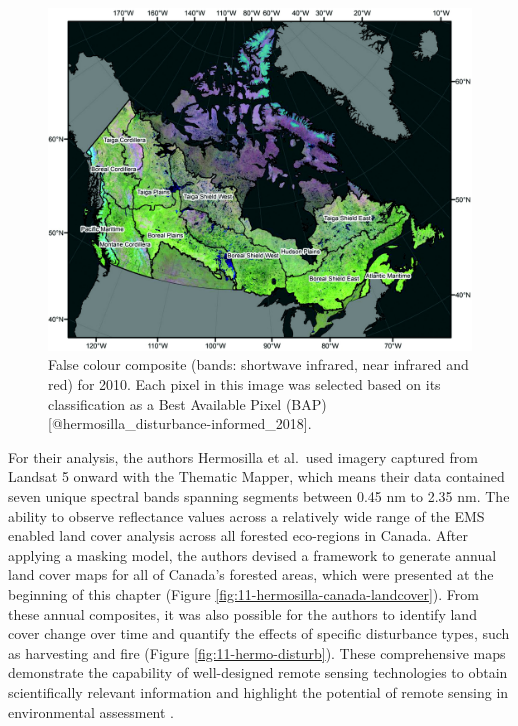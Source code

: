 \documentclass[
]{book}
\begin{document}
\begin{figure}
\includegraphics[width=0.9\linewidth]{images/11-hermosilla-false-colour} \caption{False colour composite (bands: shortwave infrared, near infrared and red) for 2010. Each pixel in this image was selected based on its classification as a Best Available Pixel (BAP) [@hermosilla_disturbance-informed_2018].}\label{fig:11-hermo-false}
\end{figure}

For their analysis, the authors Hermosilla et al.~used imagery captured from
Landsat 5 onward with the Thematic Mapper, which means their data
contained seven unique spectral bands spanning segments between 0.45 nm
to 2.35 nm. The ability to observe reflectance values across a
relatively wide range of the EMS enabled land cover analysis across all
forested eco-regions in Canada. After applying a masking model, the
authors devised a framework to generate annual land cover maps for
all of Canada's forested areas, which were presented at the beginning of
this chapter (Figure \ref{fig:11-hermosilla-canada-landcover}). From
these annual composites, it was also possible for the authors to
identify land cover change over time and quantify the effects of
specific disturbance types, such as harvesting and fire (Figure
\ref{fig:11-hermo-disturb}). These comprehensive maps demonstrate the
capability of well-designed remote sensing technologies to obtain
scientifically relevant information and highlight the potential of
remote sensing in environmental assessment \citep{hermosilla_disturbance-informed_2018}.
\end{document}
